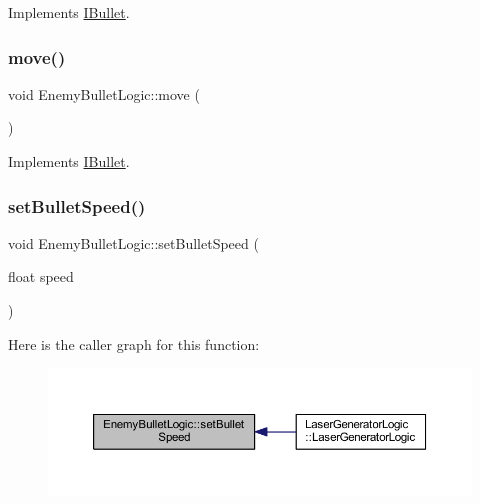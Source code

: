 Implements \hyperlink{class_i_bullet_ac1252496738126ec94a97512011b9112}{I\+Bullet}.

\mbox{\label{class_enemy_bullet_logic_aaa5273b969347ce8c6e62261ccc3df3a}} 
\subsubsection{\texorpdfstring{move()}{move()}}
{\footnotesize\ttfamily void Enemy\+Bullet\+Logic\+::move (\begin{DoxyParamCaption}{ }\end{DoxyParamCaption})\hspace{0.3cm}{\ttfamily [virtual]}}



Implements \hyperlink{class_i_bullet_a0884074f0bc793fb5a52ac33842622fd}{I\+Bullet}.

\mbox{\label{class_enemy_bullet_logic_a0263d2207f0d4332efa2cf8f8bbdc42c}} 
\subsubsection{\texorpdfstring{set\+Bullet\+Speed()}{setBulletSpeed()}}
{\footnotesize\ttfamily void Enemy\+Bullet\+Logic\+::set\+Bullet\+Speed (\begin{DoxyParamCaption}\item[{float}]{speed }\end{DoxyParamCaption})}

Here is the caller graph for this function\+:
\nopagebreak
\begin{figure}[H]
\begin{center}
\leavevmode
\includegraphics[width=350pt]{class_enemy_bullet_logic_a0263d2207f0d4332efa2cf8f8bbdc42c_icgraph}
\end{center}
\end{figure}
\mbox{\label{class_enemy_bullet_logic_a3e4ce40e06e9fa23826bd74015fd75f2}} 
